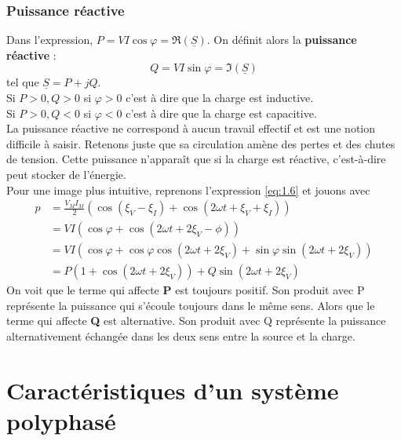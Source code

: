 \subsubsection{Puissance réactive}
Dans l'expression, $P = VI \cos\varphi = \Re(\underline{S})$. On définit alors la 
\textbf{puissance réactive} :
\begin{equation}
	Q = VI\sin\varphi = \Im(\underline{S})
\end{equation}
tel que $\underline{S} = P+jQ$.\\
Si $P>0, Q>0$ si $\varphi>0$ c'est à dire que la charge est inductive.\\
Si $P>0, Q<0$ si $\varphi<0$ c'est à dire que la charge est capacitive.\\
			
La puissance réactive ne correspond à aucun travail effectif et est une 
notion difficile à saisir. Retenons juste que sa circulation amène des 
pertes et des chutes de tension. Cette puissance n'apparaît que si la 
charge est réactive, c'est-à-dire peut stocker de l'énergie.\\
Pour une image plus intuitive, reprenons l'expression \autoref{eq:1.6} et jouons avec
\begin{equation}
	\begin{array}{ll}
		p & = \frac{V_MI_M}{2}(\cos(\xi_V-\xi_I) + \cos(2\omega t +\xi_V+\xi_I)) \\     
		&= VI(\cos \varphi + \cos (2\omega t + 2\xi _V - \phi))\\
		&= VI(\cos \varphi + \cos \varphi \cos (2\omega t + 2\xi _V) + \sin \varphi \sin (2 \omega t + 2\xi _V))\\
		&= P (1 +\cos (2\omega t +2\xi _V)) + Q\sin (2\omega t+2\xi _V)
	\end{array}
\end{equation}
	On voit que le terme qui affecte \textbf{P} est toujours positif. Son produit avec P représente la puissance qui s'écoule toujours dans le même sens. Alors que le terme qui affecte \textbf{Q} est alternative. Son produit avec Q représente la puissance alternativement échangée dans les deux sens entre la source et la charge. 
\newpage		
\section{Caractéristiques d'un système polyphasé}
